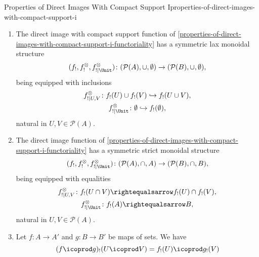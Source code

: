\begin{proposition}{Properties of Direct Images With Compact Support I}{properties-of-direct-images-with-compact-support-i}
\begin{enumerate}
        \item\label{properties-of-direct-images-with-compact-support-i-symmetric-lax-monoidality-with-respect-to-unions}The direct image with compact support function of \cref{properties-of-direct-images-with-compact-support-i-functoriality} has a symmetric lax monoidal structure
            \[
                (f_{!},f^{\otimes}_{!},f^{\otimes}_{!|\Unit})
                \colon
                (\mathcal{P}(A),\cup,\emptyset)
                \to
                (\mathcal{P}(B),\cup,\emptyset),
            \]%
            being equipped with inclusions%
            \[
                \begin{gathered}
                    f^{\otimes}_{!|U,V}   \colon f_{!}(U)\cup f_{!}(V) \hookrightarrow f_{!}(U\cup V),\\
                    f^{\otimes}_{!|\Unit} \colon \emptyset             \hookrightarrow f_{!}(\emptyset),
                \end{gathered}
            \]%
            natural in $U,V\in\mathcal{P}(A)$.
        \item\label{properties-of-direct-images-with-compact-support-i-symmetric-strict-monoidality-with-respect-to-intersections}The direct image function of \cref{properties-of-direct-images-with-compact-support-i-functoriality} has a symmetric strict monoidal structure
            \[
                (f_{!},f^{\otimes}_{!},f^{\otimes}_{!|\Unit})
                \colon
                (\mathcal{P}(A),\cap,A)
                \to
                (\mathcal{P}(B),\cap,B),
            \]%
            being equipped with equalities%
            \[
                \begin{gathered}
                    f^{\otimes}_{!|U,V}   \colon f_{!}(U\cap V) \rightequalsarrow f_{!}(U)\cap f_{!}(V),\\
                    f^{\otimes}_{!|\Unit} \colon f_{!}(A)       \rightequalsarrow B,
                \end{gathered}
            \]%
            natural in $U,V\in\mathcal{P}(A)$.
        \item\label{properties-of-direct-images-with-compact-support-i-interaction-with-coproducts}Let $f\colon A\to A'$ and $g\colon B\to B'$ be maps of sets. We have
            \[
                (f\icoprod g)_{!}(U\icoprod V)%
                =%
                f_{!}(U)\icoprod g_{!}(V)%
\]
\end{enumerate}
\end{proposition}

